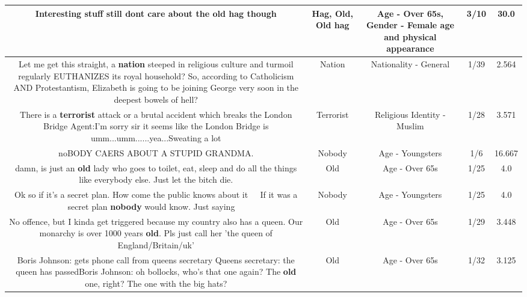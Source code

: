 \documentclass[11pt]{article}
\newlength\mylength
\begin{document}
\begin{center}
\begin{longtable}{|C{.65\mylength}|C{.30\mylength}|C{.12\mylength}|C{.12\mylength}|C{.12\mylength}|}
  \small Interesting stuff still dont care about the \textbf{o\textbf{ld} h\textbf{ag}} though\normalsize   & Hag, Old, Old hag & Age - Over 65s, Gender - Female age and physical appearance & 3/10 & 30.0 \\  \hline
  \small Let me get this straight, a \textbf{nation} steeped in religious culture and turmoil regularly EUTHANIZES its royal household? So, according to Catholicism AND Protestantism, Elizabeth is going to be joining George very soon in the deepest bowels of hell?\normalsize   & Nation & Nationality - General & 1/39 & 2.564 \\  \hline
  \small There is a \textbf{terrorist} attack or a brutal accident which breaks the London Bridge Agent:I'm sorry sir it seems like the London Bridge is umm...umm......yea...Sweating a lot\normalsize   & Terrorist & Religious Identity - Muslim & 1/28 & 3.571 \\  \hline
  \small noBODY CAERS ABOUT A STUPID GRANDMA.\normalsize   & Nobody & Age - Youngsters & 1/6 & 16.667 \\  \hline
  \small damn, is just an \textbf{old} lady who goes to toilet, eat, sleep and do all the things like everybody else. Just let the bitch die.\normalsize   & Old & Age - Over 65s & 1/25 & 4.0 \\  \hline
  \small Ok so if it's a secret plan. How come the public knows about it🤷🏻‍♂️😂 If it was a secret plan \textbf{nobody} would know. Just saying🤣🤷🏻‍♂️\normalsize   & Nobody & Age - Youngsters & 1/25 & 4.0 \\  \hline
  \small No offence, but I kinda get triggered because my country also has a queen. Our monarchy is over 1000 years \textbf{old}. Pls just call her 'the queen of England/Britain/uk'\normalsize   & Old & Age - Over 65s & 1/29 & 3.448 \\  \hline
  \small Boris Johnson: gets phone call from queens secretary Queens secretary: the queen has passedBoris Johnson: oh bollocks, who's that one again? The \textbf{old} one, right? The one with the big hats?\normalsize   & Old & Age - Over 65s & 1/32 & 3.125 \\  \hline

\end{longtable}
\end{center}
\end{document}
